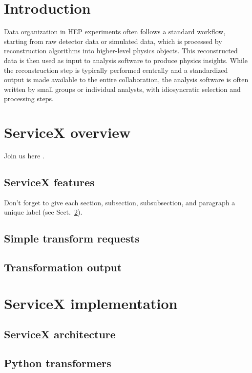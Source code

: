 \documentclass{webofc}
\begin{document}
\section{Introduction}
\label{sec:intro}
Data organization in HEP experiments often follows a standard workflow, starting from raw detector
data or simulated data, which is processed by reconstruction algorithms into higher-level physics
objects. This reconstructed data is then used as input to analysis software to produce physics
insights. While the reconstruction step is typically performed centrally and a standardized output
is made available to the entire collaboration, the analysis software is often written by small
groups or individual analysts, with idiosyncratic selection and processing steps.

\section{ServiceX overview}
\label{sec:overview}
Join us here \cite{RefServiceX}.

\subsection{ServiceX features}
\label{subsec:features}
Don't forget to give each section, subsection, subsubsection, and
paragraph a unique label (see Sect.~\ref{sec:overview}).

\subsection{Simple transform requests}
\label{subsec:requests}

\subsection{Transformation output}
\label{subsec:output}

\section{ServiceX implementation}
\label{sec:implement}

\subsection{ServiceX architecture}
\label{subsec:architect}

\subsection{Python transformers}
\label{subsec:pyTransform}
\end{document}
